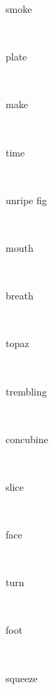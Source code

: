 \documentclass[a4paper]{article}
\begin{document}
\begin{multicols}{4}
\begin{multicols}{4}
\begin{multicols}{5}
{\hebrewfont{}} \begin{english}smoke\end{english}\\
{\hebrewfont{}} \begin{english}plate\end{english}\\
{\hebrewfont{}} \begin{english}make\end{english}\\
{\hebrewfont{}} \begin{english}time\end{english}\\
{\hebrewfont{}} \begin{english}unripe fig\end{english}\\
{\hebrewfont{}} \begin{english}mouth\end{english}\\
{\hebrewfont{}} \begin{english}breath\end{english}\\
{\hebrewfont{}} \begin{english}topaz\end{english}\\
{\hebrewfont{}} \begin{english}trembling\end{english}\\
{\hebrewfont{}} \begin{english}concubine\end{english}\\
{\hebrewfont{}} \begin{english}slice\end{english}\\
{\hebrewfont{}} \begin{english}face\end{english}\\
{\hebrewfont{}} \begin{english}turn\end{english}\\
{\hebrewfont{}} \begin{english}foot\end{english}\\
{\hebrewfont{}} \begin{english}squeeze\end{english}\\

\end{multicols}
\end{multicols}
\end{multicols}
\end{document}
